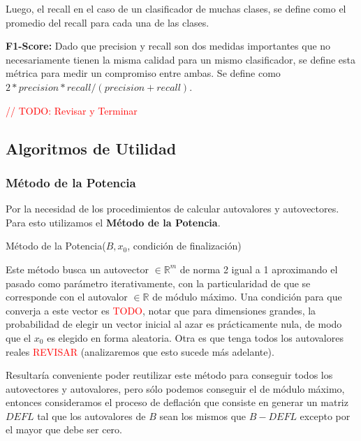 Luego, el recall en el caso de un clasificador de muchas clases, se define como el promedio del recall para cada una de las clases.

\textbf{F1-Score:} Dado que precision y recall son dos medidas importantes que no necesariamente tienen la misma calidad para un mismo clasificador, se define esta m\'etrica para medir un compromiso entre ambas. Se define como $2 * precision * recall / (precision + recall)$.

\textcolor{red}{// TODO: Revisar y Terminar}

\subsection{Algoritmos de Utilidad}

\subsubsection{M\'etodo de la Potencia}\label{desarrollo_metodo-potencia}

Por la necesidad de los procedimientos de calcular autovalores y autovectores. Para esto utilizamos el \textbf{M\'etodo de la Potencia}.

\begin{algorithm}
\begin{algorithmic}[1]
\ENDWHILE
{}
\end{algorithmic}
\caption{M\'etodo de la Potencia($B, x_{0}$, condici\'on de finalizaci\'on)}
\end{algorithm}

Este m\'etodo busca un autovector $\in \mathbb{R}^{m}$ de norma 2 igual a 1 aproximando el pasado como par\'ametro iterativamente, con la particularidad de que se corresponde con el autovalor $\in \mathbb{R}$ de m\'odulo m\'aximo. Una condici\'on para que converja a este vector es \textcolor{red}{TODO}, notar que para dimensiones grandes, la probabilidad de elegir un vector inicial al azar es pr\'acticamente nula, de modo que el $x_{0}$ es elegido en forma aleatoria. Otra es que tenga todos los autovalores reales \textcolor{red}{REVISAR} (analizaremos que esto sucede m\'as adelante).

Resultar\'ia conveniente poder reutilizar este m\'etodo para conseguir todos los autovectores y autovalores, pero s\'olo podemos conseguir el de m\'odulo m\'aximo, entonces consideramos el proceso de deflaci\'on que consiste en generar un matriz $DEFL$ tal que los autovalores de $B$ sean los mismos que $B - DEFL$ excepto por el mayor que debe ser cero.

